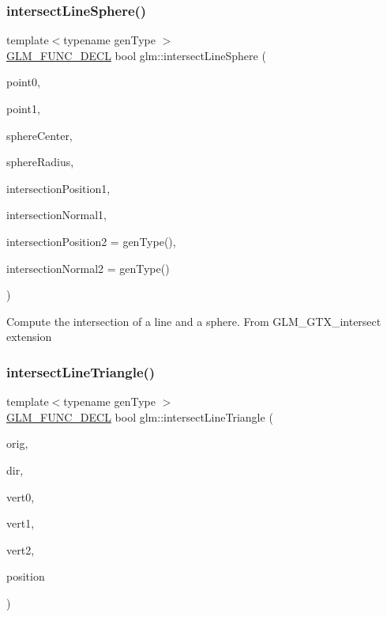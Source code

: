 \subsubsection{\texorpdfstring{intersect\+Line\+Sphere()}{intersectLineSphere()}}
{\footnotesize\ttfamily template$<$typename gen\+Type $>$ \\
\mbox{\hyperlink{setup_8hpp_ab2d052de21a70539923e9bcbf6e83a51}{G\+L\+M\+\_\+\+F\+U\+N\+C\+\_\+\+D\+E\+CL}} bool glm\+::intersect\+Line\+Sphere (\begin{DoxyParamCaption}\item[{gen\+Type const \&}]{point0,  }\item[{gen\+Type const \&}]{point1,  }\item[{gen\+Type const \&}]{sphere\+Center,  }\item[{typename gen\+Type\+::value\+\_\+type}]{sphere\+Radius,  }\item[{gen\+Type \&}]{intersection\+Position1,  }\item[{gen\+Type \&}]{intersection\+Normal1,  }\item[{gen\+Type \&}]{intersection\+Position2 = {\ttfamily genType()},  }\item[{gen\+Type \&}]{intersection\+Normal2 = {\ttfamily genType()} }\end{DoxyParamCaption})}

Compute the intersection of a line and a sphere. From G\+L\+M\+\_\+\+G\+T\+X\+\_\+intersect extension \mbox{\label{group__gtx__intersect_ga9d29b9b3acb504d43986502f42740df4}} 
\subsubsection{\texorpdfstring{intersect\+Line\+Triangle()}{intersectLineTriangle()}}
{\footnotesize\ttfamily template$<$typename gen\+Type $>$ \\
\mbox{\hyperlink{setup_8hpp_ab2d052de21a70539923e9bcbf6e83a51}{G\+L\+M\+\_\+\+F\+U\+N\+C\+\_\+\+D\+E\+CL}} bool glm\+::intersect\+Line\+Triangle (\begin{DoxyParamCaption}\item[{gen\+Type const \&}]{orig,  }\item[{gen\+Type const \&}]{dir,  }\item[{gen\+Type const \&}]{vert0,  }\item[{gen\+Type const \&}]{vert1,  }\item[{gen\+Type const \&}]{vert2,  }\item[{gen\+Type \&}]{position }\end{DoxyParamCaption})}

